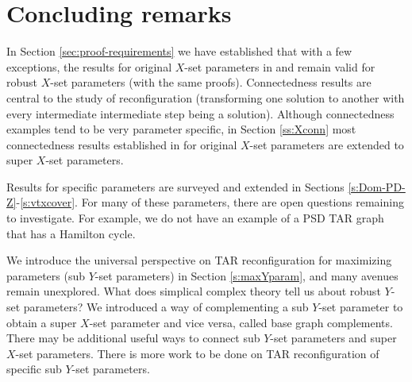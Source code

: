 \documentclass{article}
\def\red{\color{red}}
\numberwithin{figure}{section}
\numberwithin{table}{section}
\numberwithin{equation}{section}
\theoremstyle{definition}
\theoremstyle{definition}
\theoremstyle{definition}
\newcommand{\Xr}{X}
\newcommand{\xtar}{\mathfrak{X}}%
\begin{document}
{%
\section{Concluding remarks}\label{s:sum}

 In Section \ref{sec:proof-requirements} we have established that with  a few  exceptions,  the  results for original $X$-set parameters in \cite{PDrecon} and \cite{XTARiso} remain valid for robust $\Xr$-set parameters (with the same proofs). %
Connectedness results are central to the study of reconfiguration (transforming one solution to another with every intermediate intermediate step being a  solution).  Although connectedness examples tend to be very parameter specific, in  Section \ref{ss:Xconn} most connectedness results  established in \cite{PDrecon} for original $X$-set parameters are extended to  super $X$-set parameters. %

Results for specific parameters are surveyed and extended in Sections \ref{s:Dom-PD-Z}-\ref{s:vtxcover}.  For many of these parameters, there are open questions remaining to investigate.  For example, we do not have an example of a PSD TAR graph that has a Hamilton cycle.  

We introduce the universal perspective on TAR reconfiguration for maximizing parameters (sub $Y$-set parameters)  in Section \ref{s:maxYparam}, and many avenues remain unexplored.  What does simplical complex theory tell us about robust $Y$-set parameters?  We introduced a way of complementing a sub $Y$-set parameter to obtain a super $X$-set parameter and vice versa, called base graph complements.  There may be additional useful ways to connect sub $Y$-set parameters and super $X$-set parameters. There is more work to be done on TAR reconfiguration of specific sub $Y$-set parameters.

}
\end{document}
